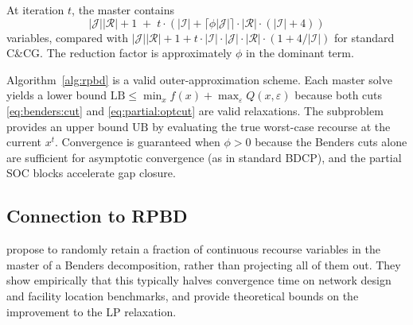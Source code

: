 \begin{remark}
At iteration $t$, the master contains
\begin{equation*}
  |\mathcal{J}||\mathcal{R}| + 1
  \;+\; t\!\cdot\!\left(
    |\mathcal{I}| + \lceil\phi|\mathcal{J}|\rceil \cdot |\mathcal{R}|
    \cdot(|\mathcal{I}|+4)
  \right)
\end{equation*}
variables, compared with
$|\mathcal{J}||\mathcal{R}| + 1 + t\cdot|\mathcal{I}|\cdot|\mathcal{J}|\cdot|\mathcal{R}|\cdot(1+4/|\mathcal{I}|)$
for standard C\&CG\@.
The reduction factor is approximately $\phi$ in the dominant term.
\end{remark}

\begin{remark}[Correctness]
Algorithm~\ref{alg:rpbd} is a valid outer-approximation scheme.
Each master solve yields a lower bound $\mathrm{LB} \le \min_x f(x)+\max_\varepsilon Q(x,\varepsilon)$
because both cuts \eqref{eq:benders:cut} and \eqref{eq:partial:optcut}
are valid relaxations.
The subproblem provides an upper bound $\mathrm{UB}$ by evaluating
the true worst-case recourse at the current $x^t$.
Convergence is guaranteed when $\phi > 0$ because the Benders cuts
alone are sufficient for asymptotic convergence (as in standard BDCP),
and the partial SOC blocks accelerate gap closure.
\end{remark}

\subsection{Connection to RPBD}
\label{sec:rpbd:connection}

\citet{PauphiletWang2024} propose to randomly retain a fraction of
continuous recourse variables in the master of a Benders decomposition,
rather than projecting all of them out.
They show empirically that this typically halves convergence time on
network design and facility location benchmarks, and provide theoretical
bounds on the improvement to the LP relaxation.

